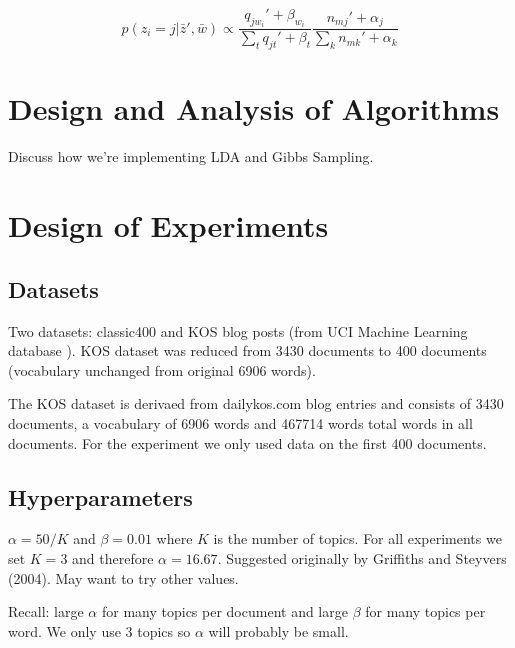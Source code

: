 \documentclass[10pt]{article}
\begin{document}
\begin{equation}
    p(z_i = j | \bar{z}', \bar{w}) \propto \frac{q_{j w_i}' + \beta_{w_i}}{\sum_t q_{jt}' + \beta_t} \frac{n_{mj}' + \alpha_j}{\sum_k n_{mk}' + \alpha_k}
\end{equation}



\section{Design and Analysis of Algorithms}
\label{sec:algorithms}

Discuss how we're implementing LDA and Gibbs Sampling.



\section{Design of Experiments}
\label{sec:experiments}

%
%
\subsection{Datasets}
Two datasets: classic400 and KOS blog posts (from UCI Machine Learning database \cite{KOS_dataset}). KOS dataset was reduced from 3430 documents to 400 documents (vocabulary unchanged from original 6906 words).

The KOS dataset is derivaed from dailykos.com blog entries and consists of 3430 documents, a vocabulary of 6906 words and 467714 words total words in all documents. For the experiment we only used data on the first 400 documents.


%
%
\subsection{Hyperparameters}
$\alpha = 50 / K$ and $\beta=0.01$ where $K$ is the number of topics. For all experiments we set $K=3$ and therefore $\alpha = 16.67$. Suggested originally by Griffiths and Steyvers (2004). May want to try other values.

Recall: large $\alpha$ for many topics per document and large $\beta$ for many topics per word. We only use 3 topics so $\alpha$ will probably be small.
\end{document}
